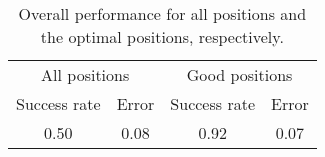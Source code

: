 \begin{table}[H]
\centering
\begin{tabular}{@{} *4c @{}}
\toprule
\multicolumn{2}{c}{All positions} & \multicolumn{2}{c}{Good positions}\\ 
\cmidrule(r){1-2}
\cmidrule(r){3-4}
Success rate & Error & Success rate & Error \\
\midrule
0.50 & 0.08 & 0.92 & 0.07\\ 
\bottomrule
 \end{tabular}
 \caption{Overall performance for all positions and the optimal positions, respectively.}
\label{table:measurement_overall}
\end{table}
